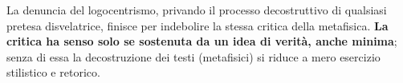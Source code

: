 La denuncia del logocentrismo, privando il
processo decostruttivo di qualsiasi pretesa
disvelatrice, finisce per indebolire la stessa
critica della metafisica. \textbf{La critica ha senso
solo se sostenuta da un idea di verità, anche
minima}; senza di essa la decostruzione dei testi
(metafisici) si riduce a mero esercizio stilistico
e retorico.